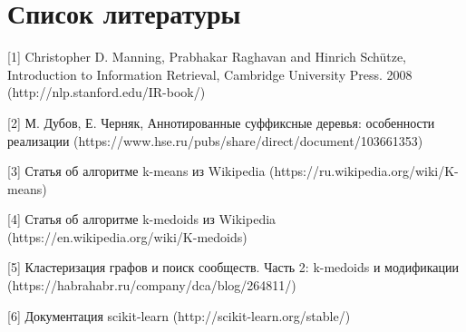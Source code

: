 \newpage
\section{Список литературы}
[1] Christopher D. Manning, Prabhakar Raghavan and Hinrich Schütze, Introduction to Information Retrieval, Cambridge University Press. 2008 (http://nlp.stanford.edu/IR-book/)

[2] М. Дубов, Е. Черняк, Аннотированные суффиксные деревья: особенности реализации (https://www.hse.ru/pubs/share/direct/document/103661353)

[3] Статья об алгоритме k-means из Wikipedia (https://ru.wikipedia.org/wiki/K-means)

[4] Статья об алгоритме k-medoids из Wikipedia (https://en.wikipedia.org/wiki/K-medoids)

[5] Кластеризация графов и поиск сообществ. Часть 2: k-medoids и модификации (https://habrahabr.ru/company/dca/blog/264811/)

[6] Документация scikit-learn (http://scikit-learn.org/stable/)